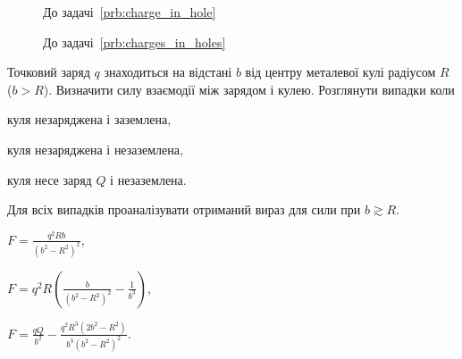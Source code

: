 \begin{figure}[h!]\centering
	\begin{minipage}[t]{0.45\linewidth}\centering
		\caption{До задачі~\ref{prb:charge_in_hole}}
		\label{charge_in_hole}
	\end{minipage}
	\begin{minipage}[t]{0.45\linewidth}\centering
		\caption{До задачі~\ref{prb:charges_in_holes}}
		\label{charges_in_holes}
	\end{minipage}
\end{figure}
\begin{problem}\label{prb:zobrazhnezazeml}
Точковий заряд $q$ знаходиться на відстані $b$ від центру металевої кулі радіусом $R$ ($ b > R$). Визначити силу взаємодії між зарядом і кулею. Розглянути випадки коли
\begin{enumerate*}[label=\alph*)]
	\item куля незаряджена і заземлена,
	\item куля незаряджена і незаземлена,
	\item куля несе заряд $Q$ і незаземлена.
\end{enumerate*}
Для всіх випадків проаналізувати отриманий вираз для сили при $b \gtrsim R$.
\begin{solution}
	\begin{enumerate*}[label=\alph*)]
		\item $F = \frac{q^2Rb}{(b^2-R^2)^2} $,
		\item $F = q^2R\left( \frac{b}{(b^2-R^2)^2} - \frac{1}{b^3}\right)$,
		\item $F = \frac{qQ}{b^2} - \frac{q^2R^3(2b^2 - R^2)}{b^3(b^2 - R^2)^2}$.
	\end{enumerate*}
\end{solution}
\end{problem}

